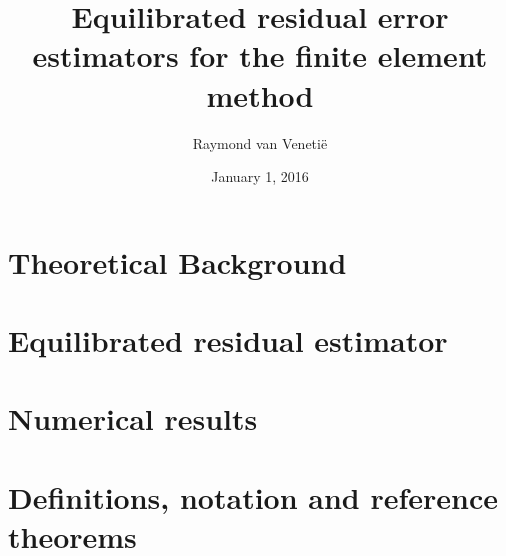 \documentclass{uvamath}
\title{Equilibrated residual error estimators for the finite element method} %
\author[raymond.van.venetie@gmail.com, 10004627]{Raymond van Veneti\"e} %
\date{January 1, 2016} %
\theoremstyle{plain}%
\theoremstyle{definition}
\theoremstyle{remark}
\begin{document}
\maketitle
\begin{abstract}
  
\end{abstract}

\tableofcontents

%

\chapter{Theoretical Background}


\chapter{Equilibrated residual estimator}


\chapter{Numerical results}


\appendix
\chapter{Definitions, notation and reference theorems}






\end{document}
